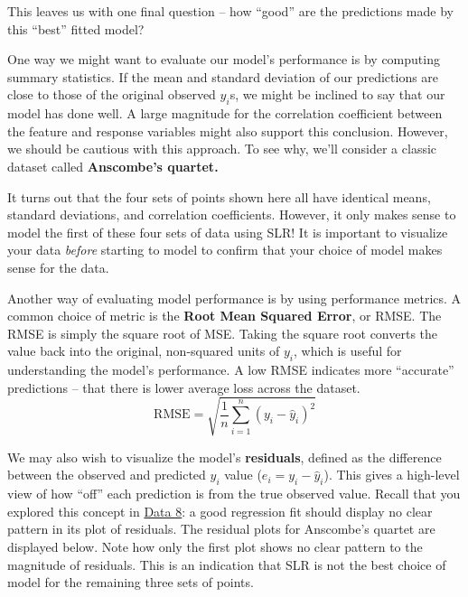 \documentclass[
  letterpaper,
  DIV=11,
  numbers=noendperiod]{scrreprt}
\begin{document}
This leaves us with one final question -- how ``good'' are the
predictions made by this ``best'' fitted model?

One way we might want to evaluate our model's performance is by
computing summary statistics. If the mean and standard deviation of our
predictions are close to those of the original observed \(y_i\)s, we
might be inclined to say that our model has done well. A large magnitude
for the correlation coefficient between the feature and response
variables might also support this conclusion. However, we should be
cautious with this approach. To see why, we'll consider a classic
dataset called \textbf{Anscombe's quartet.}

It turns out that the four sets of points shown here all have identical
means, standard deviations, and correlation coefficients. However, it
only makes sense to model the first of these four sets of data using
SLR! It is important to visualize your data \emph{before} starting to
model to confirm that your choice of model makes sense for the data.

Another way of evaluating model performance is by using performance
metrics. A common choice of metric is the \textbf{Root Mean Squared
Error}, or RMSE. The RMSE is simply the square root of MSE. Taking the
square root converts the value back into the original, non-squared units
of \(y_i\), which is useful for understanding the model's performance. A
low RMSE indicates more ``accurate'' predictions -- that there is lower
average loss across the dataset.
\[\text{RMSE} = \sqrt{\frac{1}{n} \sum_{i=1}^n (y_i - \hat{y}_i)^2}\]

We may also wish to visualize the model's \textbf{residuals}, defined as
the difference between the observed and predicted \(y_i\) value
(\(e_i = y_i - \hat{y}_i\)). This gives a high-level view of how ``off''
each prediction is from the true observed value. Recall that you
explored this concept in
\href{https://inferentialthinking.com/chapters/15/5/Visual_Diagnostics.html?highlight=heteroscedasticity\#detecting-heteroscedasticity}{Data
8}: a good regression fit should display no clear pattern in its plot of
residuals. The residual plots for Anscombe's quartet are displayed
below. Note how only the first plot shows no clear pattern to the
magnitude of residuals. This is an indication that SLR is not the best
choice of model for the remaining three sets of points.
\end{document}
